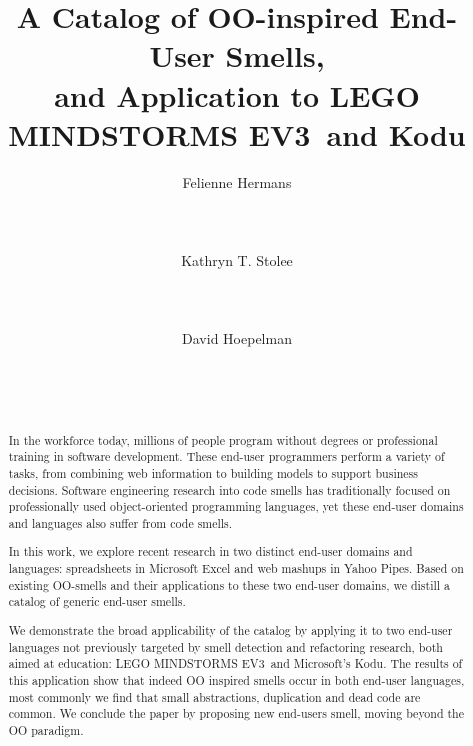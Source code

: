 \documentclass{sig-alternate}
\newcommand{\ms}{LEGO MINDSTORMS EV3}
\begin{document}
%
\title{A Catalog of OO-inspired End-User Smells, \\and Application to \ms~and Kodu}

\author{
\alignauthor
Felienne Hermans\\
       \\
       \\
       \\
\alignauthor
Kathryn T. Stolee\\
       \\
       \\
       \\
\alignauthor
David Hoepelman\\
       \\
       \\
       \\
}

\maketitle


\begin{abstract}
In the workforce today, millions of people program without degrees or professional training in software development. 
These end-user programmers perform a variety of tasks, from combining web information to building models to support business decisions. Software engineering research into code smells has traditionally focused on professionally used object-oriented programming languages, yet these end-user domains and languages also suffer from code smells. 

In this work, we explore recent research in two distinct end-user domains and languages: spreadsheets in Microsoft Excel and web mashups in Yahoo Pipes. Based on existing OO-smells and their applications to these two end-user domains, we distill a catalog of generic end-user smells. 

We demonstrate the broad applicability of the catalog by applying it to two end-user languages not previously targeted by smell detection and refactoring research, both aimed at education: \ms~and Microsoft's Kodu. The results of this application show that indeed OO inspired smells occur in both end-user languages, most commonly we find that small abstractions, duplication and dead code are common. We conclude the paper by proposing new end-users smell, moving beyond the OO paradigm. 
\end{abstract}
\end{document}
